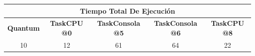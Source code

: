 \begin{center}
	\begin{tabular}{|c|c|c|c|c|}
		\hline
		\multicolumn{5}{|c|}{\large{\textbf{Tiempo Total De Ejecución}}} \\
		\hline
		\textbf{Quantum} & \textbf{TaskCPU @0} & \textbf{TaskConsola @5} & \textbf{TaskConsola @6} & \textbf{TaskCPU @8} \\
		\hline
		10 & 12 & 61 & 64 & 22 \\
		\hline
	\end{tabular}
\end{center}

